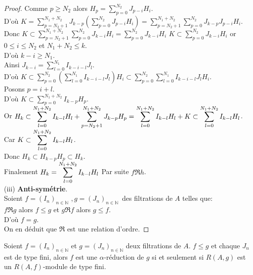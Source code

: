 \begin{proof}
	Comme $p\geq N_{2}$ alors $H_{p}=\displaystyle  \sum_{p=0}^{N_{2}}J_{p-i}H_{i}$. \\
	D'où $K=\displaystyle  \sum_{p=N_{2}+1}^{N_{1}+N_{2}}J_{k-p}(\displaystyle  \sum_{p=0}^{N_{2}}J_{p-i}H_{i})=\displaystyle  \sum_{p=N_{2}+1}^{N_{1}+N_{2}}\displaystyle  \sum_{p=0}^{N_{2}}J_{k-p}J_{p-i}H_{i}$. \\
	Donc $K\subset\displaystyle  \sum_{p=N_{2}+1}^{N_{1}+N_{2}}\displaystyle  \sum_{p=0}^{N_{2}}J_{k-i}H_{i}=\displaystyle  \sum_{p=0}^{N_{2}}J_{k-i}H_{i}$
	$K\subset \displaystyle  \sum_{p=0}^{N_{2}}J_{k-i}H_{i}$
	or $0\leq i\leq N_{2}$ et $N_{1}+N_{2}\leq k$. \\
	D'où $k-i\geq N_{1}$. \\
	Ainsi $J_{k-i}=\displaystyle  \sum_{l=0}^{N_{1}}I_{k-i-l}J_{l}$. \\
	D'où $K\subset\displaystyle  \sum_{p=0}^{N_{2}}(\displaystyle  \sum_{l=0}^{N_{1}}I_{k-i-l}J_{l})H_{i}\subset\displaystyle  \sum_{p=0}^{N_{2}}\displaystyle  \sum_{l=0}^{N_{1}}I_{k-i-l}J_{l}H_{i}$.\\
	Posons $p=i+l$. \\
	D'où $K\subset \displaystyle \sum_{p=0}^{N_{1}+N_{2}}I_{k-p}H_{p}$.\\
	Or $H_{k}\subset\displaystyle \sum_{l=0}^{N_{1}+N_{2}}I_{k-l}H_{l}+\displaystyle  \sum_{p=N_{2}+1}^{N_{1}+N_{2}}J_{k-p}H_{p}=\displaystyle  \sum_{l=0}^{N_{1}+N_{2}}I_{k-l}H_{l}+K\subset \displaystyle  \displaystyle  \sum_{l=0}^{N_{1}+N_{2}}I_{k-l}H_{l}$.\\ Car $K\subset \displaystyle  \displaystyle  \sum_{l=0}^{N_{1}+N_{2}}I_{k-l}H_{l}$.\\
	Donc $H_{k}\subset H_{k-p}H_{p}\subset H_{k}$.\\
	Finalement $H_{k}=\displaystyle  \displaystyle  \sum_{l=0}^{N_{1}+N_{2}}I_{k-l}H_{l}$
	Par suite $f \Re h$.\\
	
	(iii) \textbf{Anti-symétrie}. \\
	Soient $f=(I_{n})_{n\in \mathbb{N}}$ $,g=(J_{n})_{n\in \mathbb{N} }$\ des filtrations de $A$ telles que: \\
	$f \Re g$ alors $f\leq g$ et $g \Re f$ alors $g\leq f.$ \\
	D'où $f=g$. \\
	On en déduit que $\Re$ est une relation d'ordre. 
\end{proof}
\begin{maproposition}
	Soient $f=(I_n)_{n \in \mathbb{N}}$ et $g=(J_n)_{n \in \mathbb{N}}$ deux filtrations de $A$. $f\leqslant g$ et chaque $J_n$ est de type fini, alors $f$ est une $\alpha$-réduction de $g$ si et seulement si $R(A,g)$ est un $R(A,f)$-module de type fini.
\end{maproposition}
